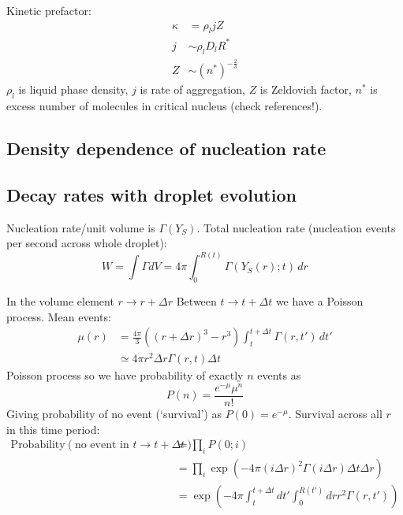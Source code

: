 \documentclass[11pt,twoside]{report}
\begin{document}
Kinetic prefactor:
\begin{align}
  \kappa &= \rho_l j Z \\
  j &\sim \rho_l D_l R^* \\
  Z &\sim (n^*)^{-\tfrac{2}{3}}
\end{align}
$\rho_l$ is liquid phase density, $j$ is rate of aggregation, $Z$ is Zeldovich factor, $n^*$ is excess number of molecules in critical nucleus (check references!).

\subsection{Density dependence of nucleation rate}
\subsection{Decay rates with droplet evolution}

Nucleation rate/unit volume is $\Gamma(Y_S)$.
Total nucleation rate (nucleation events per second across whole droplet):
\begin{equation}
  W = \int \Gamma dV
  = 4\pi \int_0^{R(t)} \Gamma(Y_S(r); t) \, dr
\end{equation}

In the volume element $r \to r + \Delta r$ Between $t \to t+\Delta t$ we have a Poisson process.
Mean events:
\begin{equation}
  \begin{aligned}
    \mu(r) &= \frac{4\pi}{3} ( (r+\Delta r)^3 - r^3)
    \int_t^{t+\Delta t} \Gamma(r,t') \, dt' \\
    &\simeq
    4\pi r^2 \Delta r \Gamma(r, t) \Delta t
  \end{aligned}
\end{equation}
Poisson process so we have probability of exactly $n$ events as
\begin{equation}
  P(n) = \frac{e^{-\mu} \mu^n}{n!}
\end{equation}
Giving probability of no event (`survival') as $P(0) = e^{-\mu}$.
Survival across all $r$ in this time period:
\begin{equation}
  \begin{aligned}
  \textrm{Probability}\left( \textrm{no event in } t \to t + \Delta t \right)
  &= \prod_i P(0;i) \\
  &= \prod_i \exp{\left(-4\pi (i\Delta r)^2 \Gamma(i\Delta r) \Delta t \Delta r\right)} \\
  &= \exp{\left(
    -4\pi \int_t^{t+\Delta t} dt' \int_0^{R(t')} dr r^2 \Gamma(r, t')
    \right)}
  \end{aligned}
\end{equation}
\end{document}
